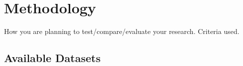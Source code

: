 \documentclass[report.tex]{subfiles}
\begin{document}
    \chapter{Methodology}

    How you are planning to test/compare/evaluate your research.
    Criteria used.

    \section{Available Datasets}

\end{document}
